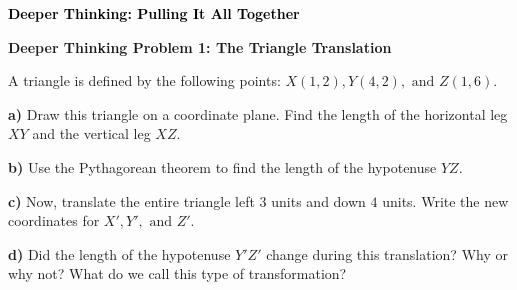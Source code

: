 \documentclass[12pt, letterpaper, fleqn]{article}
\begin{document}
\newpage

\begin{tcolorbox}[colback=customteal!20]
\large\textcolor{black}{\textbf{Deeper Thinking: Pulling It All Together}}
\end{tcolorbox}

\vspace{3mm}

\begin{tcolorbox}[colback=white!15, colframe=black, boxrule=1.5pt, arc=4mm, left=6mm, right=6mm, top=5mm, bottom=5mm]

\textbf{Deeper Thinking Problem 1: The Triangle Translation}

\medskip

\noindent
A triangle is defined by the following points: $X(1, 2), Y(4, 2), \text{ and } Z(1, 6)$.

\vspace{5mm}

\noindent
\textbf{a)} Draw this triangle on a coordinate plane. Find the length of the horizontal leg $XY$ and the vertical leg $XZ$.

\vspace{2.5cm}

\noindent
\textbf{b)} Use the Pythagorean theorem to find the length of the hypotenuse $YZ$.

\vspace{2.5cm}

\noindent
\textbf{c)} Now, translate the entire triangle left $3$ units and down $4$ units. Write the new coordinates for $X', Y', \text{ and } Z'$.

\vspace{2.5cm}

\noindent
\textbf{d)} Did the length of the hypotenuse $Y'Z'$ change during this translation? Why or why not? What do we call this type of transformation?

\vspace{2cm}

\end{tcolorbox}
\end{document}
